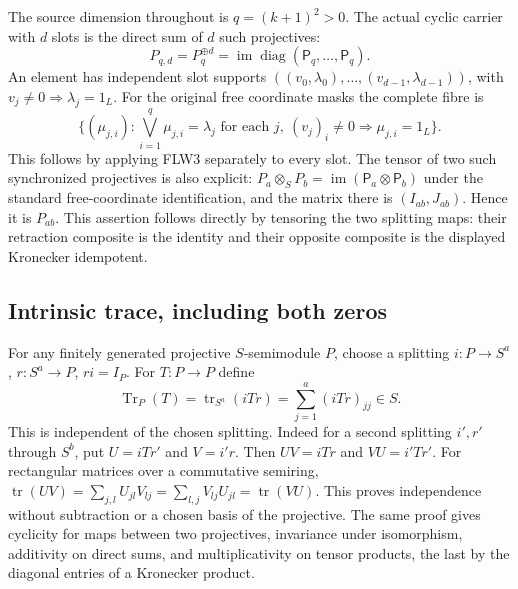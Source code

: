 The source dimension throughout is $q=(k+1)^2>0$. The actual cyclic
carrier with $d$ slots is the direct sum of $d$ such projectives:
\[
 P_{q,d}=P_q^{\oplus d}=\operatorname{im}
        \operatorname{diag}(\mathsf P_q,\ldots,\mathsf P_q).
 \tag{FLW5}
\]
An element has independent slot supports
$((v_0,\lambda_0),\ldots,(v_{d-1},\lambda_{d-1}))$, with
$v_j\ne0\Rightarrow\lambda_j=1_L$.
For the original free coordinate masks the complete fibre is
\[
 \{(\mu_{j,i}):\bigvee_{i=1}^q\mu_{j,i}=\lambda_j
                 \text{ for each }j,
             \ (v_j)_i\ne0\Rightarrow\mu_{j,i}=1_L\}.
 \tag{FLW6}
\]
This follows by applying FLW3 separately to every slot. The tensor
of two such synchronized projectives is also explicit:
$P_a\otimes_S P_b=\operatorname{im}(\mathsf P_a\otimes\mathsf P_b)$
under the standard free-coordinate identification, and the matrix
there is $(I_{ab},J_{ab})$. Hence it is $P_{ab}$.
This assertion follows directly by tensoring the two splitting maps:
their retraction composite is the identity and their opposite
composite is the displayed Kronecker idempotent.

\subsection{Intrinsic trace, including both zeros}

For any finitely generated projective $S$-semimodule $P$, choose
a splitting $i:P\to S^a$, $r:S^a\to P$, $ri=I_P$.
For $T:P\to P$ define
\[
 \operatorname{Tr}_P(T)=\operatorname{tr}_{S^a}(iTr)
                     =\sum_{j=1}^a(iTr)_{jj}\in S.
 \tag{FLW7}
\]
This is independent of the chosen splitting. Indeed for a second
splitting $i',r'$ through $S^b$, put $U=iTr'$ and $V=i'r$.
Then $UV=iTr$ and $VU=i'Tr'$. For rectangular matrices over a
commutative semiring,
$\operatorname{tr}(UV)=\sum_{j,l}U_{jl}V_{lj}
=\sum_{l,j}V_{lj}U_{jl}=\operatorname{tr}(VU)$.
This proves independence without subtraction or a chosen basis of
the projective. The same proof gives cyclicity for maps between two
projectives, invariance under isomorphism, additivity on direct sums,
and multiplicativity on tensor products, the last by the diagonal
entries of a Kronecker product.

